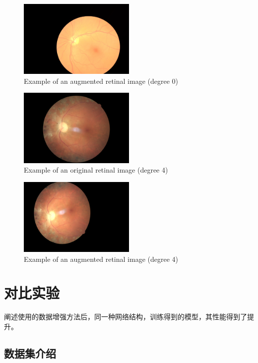 \documentclass{ijisa}
\begin{document}
\begin{figure}[h]
\includegraphics[width=0.5\textwidth]{figures/0._0_261439.jpeg}
\caption{Example of an augmented retinal image (degree 0)}
\end{figure}

\begin{figure}[h]
\includegraphics[width=0.5\textwidth]{figures/four.294_leftN.jpeg}
\caption{Example of an original retinal image (degree 4)}
\end{figure}

\begin{figure}[h]
\includegraphics[width=0.5\textwidth]{figures/4._0_1293792.jpeg}
\caption{Example of an augmented retinal image (degree 4)}
\end{figure}


\section{对比实验}
阐述使用的数据增强方法后，同一种网络结构，训练得到的模型，其性能得到了提升。
\subsection{数据集介绍}
\end{document}
